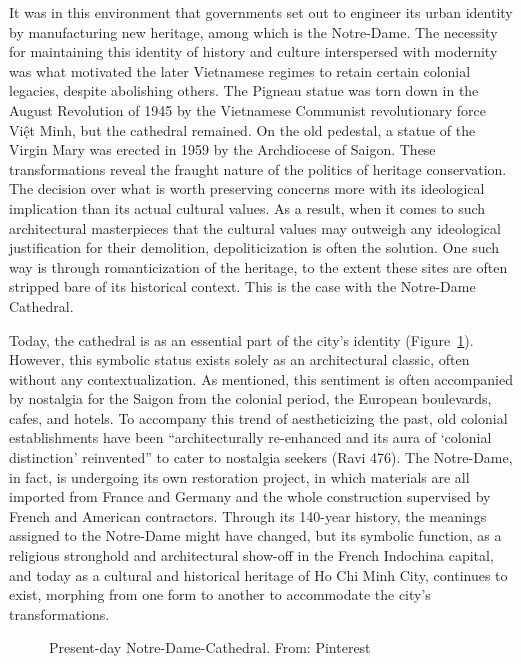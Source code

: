 It was in this environment that governments set out to engineer its urban identity by manufacturing new heritage, among which is the Notre-Dame. The necessity for maintaining this identity of history and culture interspersed with modernity was what motivated the later Vietnamese regimes to retain certain colonial legacies, despite abolishing others. The Pigneau statue was torn down in the August Revolution of 1945 by the Vietnamese Communist revolutionary force Việt Minh, but the cathedral remained. On the old pedestal, a statue of the Virgin Mary was erected in 1959 by the Archdiocese of Saigon.  These transformations reveal the fraught nature of the politics of heritage conservation. The decision over what is worth preserving concerns more with its ideological implication than its actual cultural values. As a result, when it comes to such architectural masterpieces that the cultural values may outweigh any ideological justification for their demolition, depoliticization is often the solution. One such way is through romanticization of the heritage, to the extent these sites are often stripped bare of its historical context. This is the case with the Notre-Dame Cathedral.

Today, the cathedral is as an essential part of the city’s identity (Figure~\ref{cathedral_present}). However, this symbolic status exists solely as an architectural classic, often without any contextualization.  As mentioned, this sentiment is often accompanied by nostalgia for the Saigon from the colonial period, the European boulevards, cafes, and hotels.  To accompany this trend of aestheticizing the past, old colonial establishments have been “architecturally re-enhanced and its aura of ‘colonial distinction’ reinvented” to cater to nostalgia seekers (Ravi 476).  The Notre-Dame, in fact, is undergoing its own restoration project, in which materials are all imported from France and Germany and the whole construction supervised by French and American contractors. Through its 140-year history, the meanings assigned to the Notre-Dame might have changed, but its symbolic function, as a religious stronghold and architectural show-off in the French Indochina capital, and today as a cultural and historical heritage of Ho Chi Minh City, continues to exist, morphing from one form to another to accommodate the city’s transformations. \en

\begin{figure}[!ht]
\begin{center}
\vspace{-.2 in}
\caption[Present-day Notre-Dame Cathedral]{Present-day Notre-Dame-Cathedral. From: Pinterest \en}\label{cathedral_present}
\end{center}
\vspace{-.2 in}
\end{figure}

